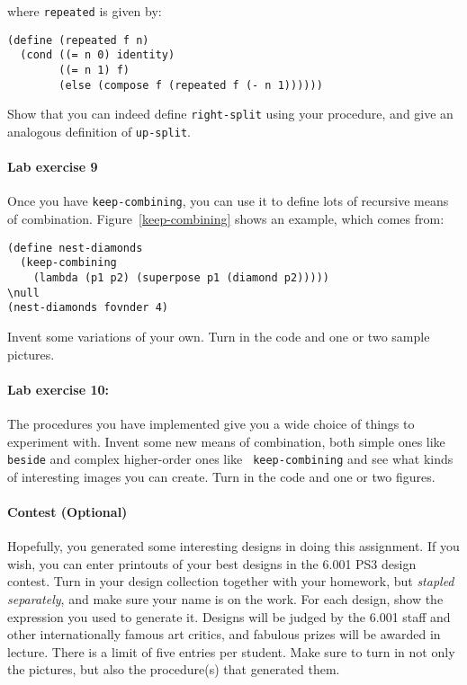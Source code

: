where {\tt repeated} is given by:

\begin{verbatim}
(define (repeated f n)
  (cond ((= n 0) identity)
        ((= n 1) f)
        (else (compose f (repeated f (- n 1))))))
\end{verbatim}

\noindent
Show that you can indeed define {\tt right-split} using your
procedure, and give an analogous definition of {\tt up-split}.


\paragraph{Lab exercise 9}
Once you have {\tt keep-combining}, you can use it to define lots of
recursive means of combination.  Figure~\ref{keep-combining} shows
an example, which comes from:

\begin{verbatim}
(define nest-diamonds
  (keep-combining
    (lambda (p1 p2) (superpose p1 (diamond p2)))))
\null
(nest-diamonds fovnder 4)
\end{verbatim}

\noindent
Invent some variations of your own.  Turn in the code
and one or two sample pictures.


\paragraph{Lab exercise 10:}
The procedures you have implemented give you a wide choice of things
to experiment with.  Invent some new means of combination, both simple
ones like {\tt beside} and complex higher-order ones like {\tt
keep-combining} and see what kinds of interesting images you can create.
Turn in the code and one or two figures.

\paragraph{Contest (Optional)}

Hopefully, you generated some interesting designs in doing this
assignment.  If you wish, you can enter printouts of your best designs
in the 6.001 PS3 design contest.  Turn in your design collection
together with your homework, but {\em stapled separately}, and make
sure your name is on the work.  For each design, show the expression
you used to generate it.  Designs will be judged by the 6.001 staff
and other internationally famous art critics, and fabulous prizes will
be awarded in lecture.  There is a limit of five entries per student.
Make sure to turn in not only the pictures, but also the procedure(s)
that generated them.

